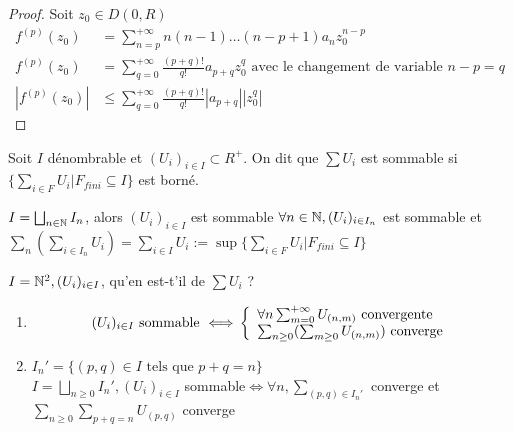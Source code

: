 \documentclass[]{report}
\begin{document}
\begin{proof}
    Soit $z_0\in D(0,R)$\\
    \begin{align*}f^{(p)}(z_0)&=\sum_{n=p}^{+\infty}n(n-1)\ldots(n-p+1)a_nz_0^{n-p}\\
    f^{(p)}(z_0)&=\sum_{q=0}^{+\infty}\frac{(p+q)!}{q!}a_{p+q}z_0^q\text{ avec le changement de variable $n-p=q$}\\
    |f^{(p)}(z_0)|&\leq \sum_{q=0}^{+\infty}\frac{(p+q)!}{q!}|a_{p+q}||z_0^q|
    \end{align*}
\end{proof}

\begin{ra}
    Soit $I$ dénombrable et $(U_i)_{i\in I} \subset R^+$. On dit que $\sum U_i$ est sommable si $\{\sum_{i\in F}U_i |F_{fini}\subseteq I\}$ est borné.
\end{ra}

\begin{prop}
    $I=\bigsqcup_{n\in \mathbb{N}}I_n$, alors $(U_i)_{i\in I}$ est sommable \ssi $\forall n\in\mathbb{N}, (U_i)_{i\in I_n}$ est sommable et $\sum_n(\sum_{i\in I_n}U_i)=\sum_{i\in I }U_i:=\sup\{\sum_{i\in F}U_i|F_{fini}\subseteq I\}$
\end{prop}

\begin{ex}
    $I=\mathbb{N}^2,(U_i)_{i\in I}$, qu'en est-t'il de $\sum U_i $ ?\\
    \begin{enumerate} 
        \item 
            \[\text{$(U_i)_{i\in I}$ sommable $\iff$}\left\{\begin{array}{ll} \forall n \sum_{m=0}^{+\infty}U_{(n,m)} \text{ convergente}\\
            \sum_{n\ge0}(\sum_{m\ge0} U_{(n,m)}) \text{ converge} \end{array} \right.\]
        \item $I_n'=\{(p,q)\in I \text{ tels que } p+q=n\}$\\
            $I=\bigsqcup_{n\ge0}I_n',(U_i)_{i\in I} $ sommable$\iff\forall n,\sum_{(p,q)\in I_n'}$ converge et $\sum_{n\ge0}\sum_{p+q=n}U_{(p,q)}$ converge
    \end{enumerate}
\end{ex}
\end{document}
